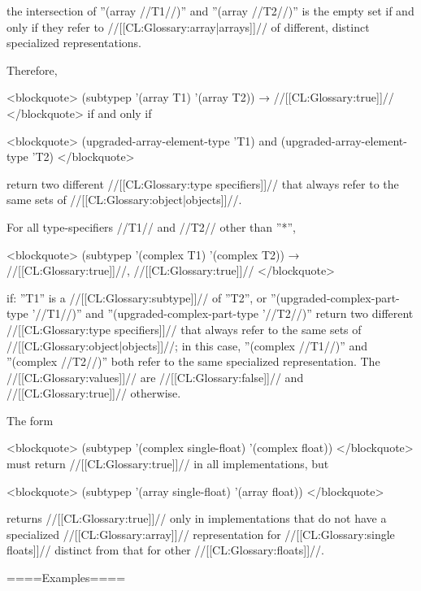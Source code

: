the intersection of ''(array //T1//)'' and ''(array //T2//)'' is the empty set if and only if they refer to //[[CL:Glossary:array|arrays]]// of different, distinct specialized representations.

Therefore,

<blockquote> (subtypep '(array T1) '(array T2)) → //[[CL:Glossary:true]]// </blockquote> if and only if

<blockquote> (upgraded-array-element-type 'T1) and (upgraded-array-element-type 'T2) </blockquote>

return two different //[[CL:Glossary:type specifiers]]// that always refer to the same sets of //[[CL:Glossary:object|objects]]//.

For all type-specifiers //T1// and //T2// other than ''*'',

<blockquote> (subtypep '(complex T1) '(complex T2)) → //[[CL:Glossary:true]]//, //[[CL:Glossary:true]]// </blockquote>

if: \beginlist {} ''T1'' is a //[[CL:Glossary:subtype]]// of ''T2'', or  ''(upgraded-complex-part-type '//T1//)'' and ''(upgraded-complex-part-type '//T2//)'' return two different //[[CL:Glossary:type specifiers]]// that always refer to the same sets of //[[CL:Glossary:object|objects]]//; in this case, ''(complex //T1//)'' and ''(complex //T2//)'' both refer to the same specialized representation. \endlist The //[[CL:Glossary:values]]// are //[[CL:Glossary:false]]// and //[[CL:Glossary:true]]// otherwise.

The form

<blockquote> (subtypep '(complex single-float) '(complex float)) </blockquote> must return //[[CL:Glossary:true]]// in all implementations, but

<blockquote> (subtypep '(array single-float) '(array float)) </blockquote>

returns //[[CL:Glossary:true]]// only in implementations that do not have a specialized //[[CL:Glossary:array]]// representation for //[[CL:Glossary:single floats]]// distinct from that for other //[[CL:Glossary:floats]]//.



====Examples====

